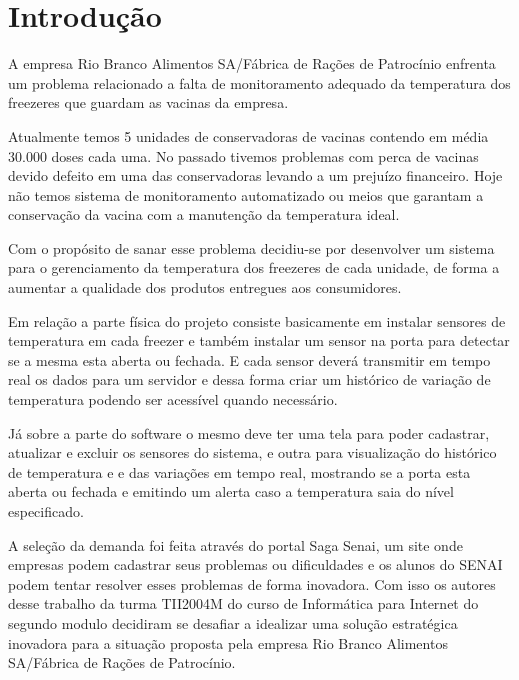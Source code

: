 \documentclass[hidelinks, 12pt, a4paper, brazil, oneside]{abntex2}
\begin{document}
\imprimircapa
\imprimirfolhaderosto

\listoffigures
\tableofcontents

\textual

\chapter{Introdução}

    A empresa 
    Rio Branco Alimentos SA/Fábrica de Rações de Patrocínio
    enfrenta um problema relacionado a falta de monitoramento 
    adequado da temperatura dos freezeres que guardam as vacinas
    da empresa.

    \begin{citacao}
        Atualmente temos 5 unidades de conservadoras de vacinas contendo 
        em média 30.000 doses cada uma.
        No passado tivemos problemas com perca de vacinas devido 
        defeito em uma das conservadoras levando a um prejuízo financeiro.
        Hoje não temos sistema de monitoramento automatizado ou meios 
        que garantam a conservação da vacina com a 
        manutenção da temperatura ideal. \cite{senaiDemanda}
    \end{citacao}

    Com o propósito de sanar esse problema decidiu-se por desenvolver
    um sistema para o gerenciamento da temperatura dos freezeres
    de cada unidade, de forma a aumentar a qualidade dos produtos
    entregues aos consumidores.

    Em relação a parte física do projeto consiste basicamente
    em instalar sensores de temperatura em cada freezer e 
    também instalar um sensor na porta para detectar se a 
    mesma esta aberta ou fechada. E cada sensor deverá transmitir 
    em tempo real os dados para um servidor e dessa forma 
    criar um histórico de variação de temperatura podendo 
    ser acessível quando necessário.

    Já sobre a parte do software o mesmo deve ter uma tela para
    poder cadastrar, atualizar e excluir os sensores do sistema, 
    e outra para visualização do histórico de temperatura e 
    e das variações em tempo real, mostrando se a porta esta 
    aberta ou fechada e emitindo um alerta caso a temperatura
    saia do nível especificado.

    A seleção da demanda foi feita através do portal Saga Senai, um 
    site onde empresas podem cadastrar seus problemas ou 
    dificuldades e os alunos do SENAI podem tentar resolver 
    esses problemas de forma inovadora. 
    Com isso os autores desse trabalho da turma TII2004M
    do curso de Informática para Internet do segundo modulo
    decidiram se desafiar a idealizar 
    uma solução estratégica inovadora para a situação 
    proposta pela empresa 
    Rio Branco Alimentos SA/Fábrica de Rações de Patrocínio.
\end{document}
